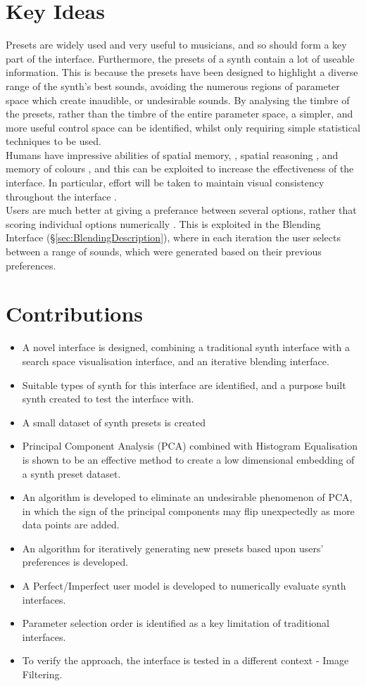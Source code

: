 \documentclass[11pt, oneside]{report}   	%
\begin{document}
\section{Key Ideas}
Presets are widely used and very useful to musicians, and so should form a key part of the interface. Furthermore, the presets of a synth contain a lot of useable information. This is because the presets have been designed to highlight a diverse range of the synth's best sounds, avoiding the numerous regions of parameter space which create inaudible, or undesirable sounds. By analysing the timbre of the presets, rather than the timbre of the entire parameter space, a simpler, and more useful control space can be identified, whilst only requiring simple statistical techniques to be used.\\
%
Humans have impressive abilities of spatial memory, \cite{SpatialMemory}, spatial reasoning \cite{SpatialCognition}, and memory of colours \cite{MemoryColour}, and this can be exploited to increase the effectiveness of the interface. In particular, effort will be taken to maintain visual consistency throughout the interface \cite{Consistency}.\\
%
Users are much better at giving a preferance between several options, rather that scoring individual options numerically \cite{RatingRanking, PreferenceGallery}. This is exploited in the Blending Interface (\S \ref{sec:BlendingDescription}), where in each iteration the user selects between a range of sounds, which were generated based on their previous preferences.
%
\section{Contributions}
\begin{itemize}
	\setlength\itemsep{-1.0em}
	\item A novel interface is designed, combining a traditional synth interface with a search space visualisation interface, and an iterative blending interface.
	\item Suitable types of synth for this interface are identified, and a purpose built synth created to test the interface with.
	\item A small dataset of synth presets is created
	\item Principal Component Analysis (PCA) combined with Histogram Equalisation is shown to be an effective method to create a low dimensional embedding of a synth preset dataset.
	\item An algorithm is developed to eliminate an undesirable phenomenon of PCA, in which the sign of the principal components may flip unexpectedly as more data points are added.
	\item An algorithm for iteratively generating new presets based upon users' preferences is developed.
	\item A Perfect/Imperfect user model is developed to numerically evaluate synth interfaces.
	\item Parameter selection order is identified as a key limitation of traditional interfaces.
	\item To verify the approach, the interface is tested in a different context - Image Filtering.
\end{itemize}
\end{document}
